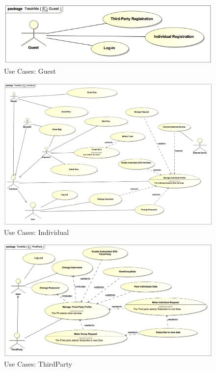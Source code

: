 \documentclass[a4paper]{article}
\begin{document}
        \begin{figure}[!htpb]
    	\centering
    	\includegraphics[width=\textwidth]{images/UML/Guest.jpg}
    	\caption{Use Cases: Guest}
    	\end{figure}
        \begin{figure}[!htpb]
    	\centering
    	\includegraphics[width=\textwidth]{images/UML/Individual.jpg}
    	\caption{Use Cases: Individual}
    	\end{figure}
    	\begin{figure}[!htpb]
    	\centering
    	\includegraphics[width=\textwidth]{images/UML/ThirdParty.jpg}
    	\caption{Use Cases: ThirdParty}
        \end{figure}
\end{document}
